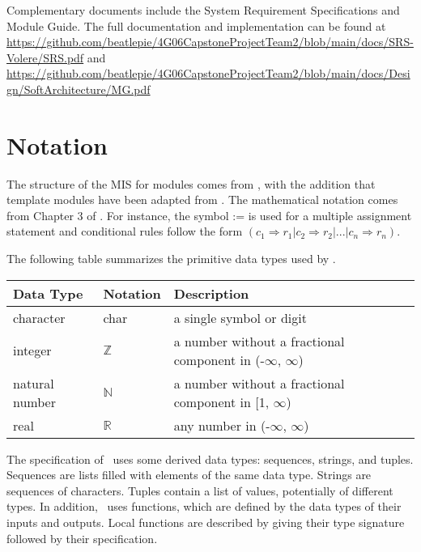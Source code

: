 \documentclass[12pt, titlepage]{article}
\begin{document}
Complementary documents include the System Requirement Specifications
and Module Guide.  The full documentation and implementation can be
found at \url{https://github.com/beatlepie/4G06CapstoneProjectTeam2/blob/main/docs/SRS-Volere/SRS.pdf} and \url{https://github.com/beatlepie/4G06CapstoneProjectTeam2/blob/main/docs/Design/SoftArchitecture/MG.pdf}

\section{Notation}


The structure of the MIS for modules comes from \citet{HoffmanAndStrooper1995},
with the addition that template modules have been adapted from
\cite{GhezziEtAl2003}.  The mathematical notation comes from Chapter 3 of
\citet{HoffmanAndStrooper1995}.  For instance, the symbol := is used for a
multiple assignment statement and conditional rules follow the form $(c_1
\Rightarrow r_1 | c_2 \Rightarrow r_2 | ... | c_n \Rightarrow r_n )$.

The following table summarizes the primitive data types used by \progname. 

\begin{center}
\renewcommand{\arraystretch}{1.2}
\noindent 
\begin{tabular}{l l p{7.5cm}} 
\toprule 
\textbf{Data Type} & \textbf{Notation} & \textbf{Description}\\ 
\midrule
character & char & a single symbol or digit\\
integer & $\mathbb{Z}$ & a number without a fractional component in (-$\infty$, $\infty$) \\
natural number & $\mathbb{N}$ & a number without a fractional component in [1, $\infty$) \\
real & $\mathbb{R}$ & any number in (-$\infty$, $\infty$)\\
\bottomrule
\end{tabular} 
\end{center}

\noindent
The specification of \progname \ uses some derived data types: sequences, strings, and
tuples. Sequences are lists filled with elements of the same data type. Strings
are sequences of characters. Tuples contain a list of values, potentially of
different types. In addition, \progname \ uses functions, which
are defined by the data types of their inputs and outputs. Local functions are
described by giving their type signature followed by their specification.
\end{document}
